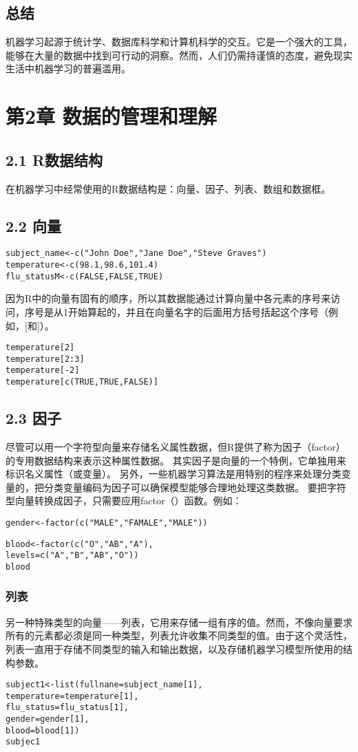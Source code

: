 \documentclass[11pt]{article}
\begin{document}
\subsection{总结}
\label{sec:org6a3ad55}
机器学习起源于统计学、数据库科学和计算机科学的交互。它是一个强大的工具，能够在大量的数据中找到可行动的洞察。然而，人们仍需持谨慎的态度，避免现实生活中机器学习的普遍滥用。
\section{第2章 数据的管理和理解}
\label{sec:org43cf50b}
\subsection{2.1 R数据结构}
\label{sec:org78ddd4d}
在机器学习中经常使用的R数据结构是：向量、因子、列表、数组和数据框。
\subsection{2.2 向量}
\label{sec:org1180a76}
\begin{verbatim}
subject_name<-c("John Doe","Jane Doe","Steve Graves")
temperature<-c(98.1,98.6,101.4)
flu_statusM<-c(FALSE,FALSE,TRUE)
\end{verbatim}
因为R中的向量有固有的顺序，所以其数据能通过计算向量中各元素的序号来访问，序号是从1开始算起的，并且在向量名字的后面用方括号括起这个序号（例如，[和]）。
\begin{verbatim}
temperature[2]
temperature[2:3]
temperature[-2]
temperature[c(TRUE,TRUE,FALSE)]
\end{verbatim}
\subsection{2.3 因子}
\label{sec:org84b0c08}
尽管可以用一个字符型向量来存储名义属性数据，但R提供了称为因子（factor）的专用数据结构来表示这种属性数据。
其实因子是向量的一个特例，它单独用来标识名义属性（或变量）。
另外，一些机器学习算法是用特别的程序来处理分类变量的，把分类变量编码为因子可以确保模型能够合理地处理这类数据。
要把字符型向量转换成因子，只需要应用factor（）函数。例如：
\begin{verbatim}
gender<-factor(c("MALE","FAMALE","MALE"))
\end{verbatim}

\begin{verbatim}
blood<-factor(c("O","AB","A"),
levels=c("A","B","AB","O"))
blood
\end{verbatim}
\subsubsection{列表}
\label{sec:org1ec475b}
另一种特殊类型的向量——列表，它用来存储一组有序的值。然而，不像向量要求所有的元素都必须是同一种类型，列表允许收集不同类型的值。由于这个灵活性，列表一直用于存储不同类型的输入和输出数据，以及存储机器学习模型所使用的结构参数。
\begin{verbatim}
subject1<-list(fullnane=subject_name[1],
temperature=temperature[1],
flu_status=flu_status[1],
gender=gender[1],
blood=blood[1])
subjec1
\end{verbatim}
\end{document}
